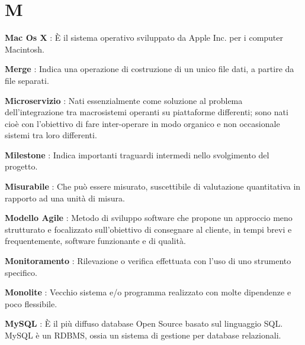 \documentclass[12pt,a4paper,titlepage]{article}
\begin{document}
\section{M}
\begin{trivlist}
\item \textbf{Mac Os X} : È il sistema operativo sviluppato da Apple Inc. per i computer Macintosh.
\item \textbf{Merge} : Indica una operazione di costruzione di un unico file dati, a partire da file separati.
\item \textbf{Microservizio} : Nati essenzialmente come soluzione al problema dell'integrazione tra macrosistemi operanti su piattaforme differenti; sono nati cioè con l'obiettivo di fare inter-operare in modo organico e non occasionale sistemi tra loro differenti. 
\item \textbf{Milestone} : Indica importanti traguardi intermedi nello svolgimento del progetto.
\item \textbf{Misurabile} : Che può essere misurato, suscettibile di valutazione quantitativa in rapporto ad una unità di misura.
\item \textbf{Modello Agile} : Metodo di sviluppo software che propone un approccio meno strutturato e focalizzato sull'obiettivo di consegnare al cliente, in tempi brevi e frequentemente, software funzionante e di qualità.
\item \textbf{Monitoramento} : Rilevazione o verifica effettuata con l'uso di uno strumento specifico.
\item \textbf{Monolite} : Vecchio sistema e/o programma realizzato con molte dipendenze e poco flessibile.
\item \textbf{MySQL} : È il più diffuso database Open Source basato sul linguaggio SQL. MySQL è un RDBMS, ossia un sistema di gestione per database relazionali.
\end{trivlist}

\end{document}
